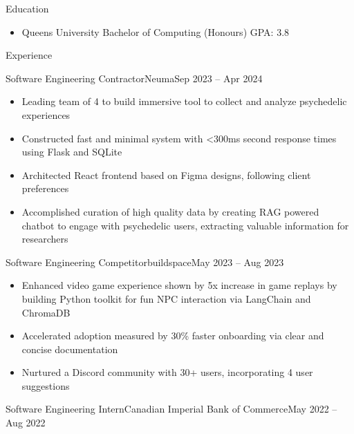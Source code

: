 \documentclass[]{mcdowellcv}
\begin{document}
\makeheader
      

\begin{cvsection}{Education}
	\begin{cvsubsection}{}{}{}
		\begin{itemize}
			\item Queen\textquotesingle{}s University \textbar{} Bachelor of Computing (Honours) \textbar{} GPA: 3.8
		\end{itemize}
	\end{cvsubsection}
\end{cvsection}
\begin{cvsection}{Experience}
	\begin{cvsubsection}{Software Engineering Contractor}{Neuma}{Sep 2023 -- Apr 2024}
		            
		\begin{itemize}%
			\item Leading team of 4 to build immersive tool to collect and analyze psychedelic experiences
			\item Constructed fast and minimal system with \textless{}300ms second response times using Flask and SQLite
			\item Architected React frontend based on Figma designs, following client preferences
			\item Accomplished curation of high quality data by creating RAG powered chatbot to engage with psychedelic users, extracting valuable information for researchers
		\end{itemize}
	\end{cvsubsection}
	\begin{cvsubsection}{Software Engineering Competitor}{buildspace}{May 2023 -- Aug 2023}
		            
		\begin{itemize}%
			\item Enhanced video game experience shown by 5x increase in game replays by building Python toolkit for fun NPC interaction via LangChain and ChromaDB
			\item Accelerated adoption measured by 30\% faster onboarding via clear and concise documentation
			\item Nurtured a Discord community with 30+ users, incorporating 4 user suggestions
		\end{itemize}
	\end{cvsubsection}
	\begin{cvsubsection}{Software Engineering Intern}{Canadian Imperial Bank of Commerce}{May 2022 -- Aug 2022}
		            

\end{cvsubsection}
\end{cvsection}
\end{document}
